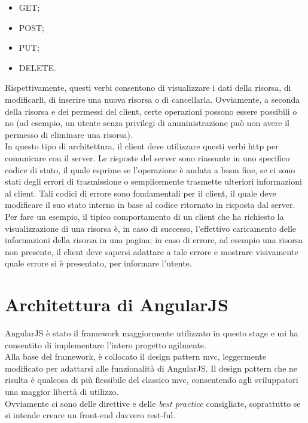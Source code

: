 \begin{itemize}
	\item GET;
	\item POST;
	\item PUT;
	\item DELETE.
\end{itemize}
Rispettivamente, questi verbi consentono di visualizzare i dati della risorsa, di modificarli, di inserire una nuova risorsa o di cancellarla. Ovviamente, a seconda della risorsa e dei permessi del client, certe operazioni possono essere possibili o no (ad esempio, un utente senza privilegi di amministrazione può non avere il permesso di eliminare una risorsa).\\
In questo tipo di architettura, il client deve utilizzare questi verbi \gls{http} per comunicare con il server. Le risposte del server sono riassunte in uno specifico codice di stato, il quale esprime se l'operazione è andata a buon fine, se ci sono stati degli errori di trasmissione o semplicemente trasmette ulteriori informazioni al client. Tali codici di errore sono fondamentali per il client, il quale deve modificare il suo stato interno in base al codice ritornato in risposta dal server. Per fare un esempio, il tipico comportamento di un client che ha richiesto la visualizzazione di una risorsa è, in caso di successo, l'effettivo caricamento delle informazioni della risorsa in una pagina; in caso di errore, ad esempio una risorsa non presente, il client deve sapersi adattare a tale errore e mostrare visivamente quale errore si è presentato, per informare l'utente.


\section{Architettura di AngularJS}
AngularJS è stato il framework maggiormente utilizzato in questo stage e mi ha consentito di implementare l'intero progetto agilmente.\\
Alla base del framework, è collocato il design pattern \gls{mvc}, leggermente modificato per adattarsi alle funzionalità di AngularJS. Il design pattern che ne risulta è qualcosa di più flessibile del classico \gls{mvc}, consentendo agli sviluppatori una maggior libertà di utilizzo.\\
Ovviamente ci sono delle direttive e delle \emph{best practice} consigliate, soprattutto se si intende creare un \gls{front-end} davvero \gls{rest}-ful.

